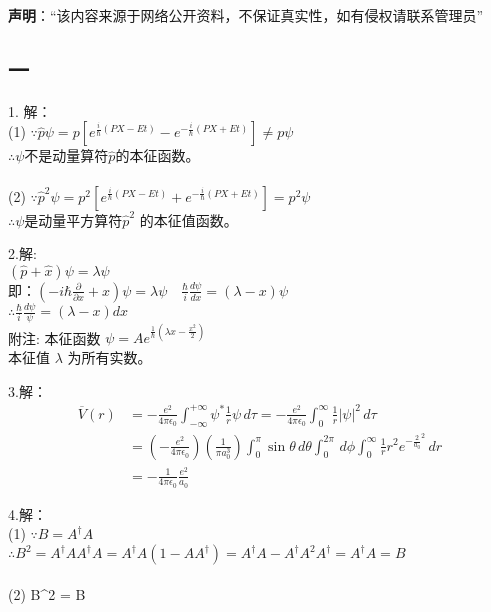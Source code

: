 
\textbf{声明}：“该内容来源于网络公开资料，不保证真实性，如有侵权请联系管理员”


\subsection{一}
1. 解：\\
(1) $\because \hat{p} \psi = p\left[e^{\frac{i}{\hbar}(PX - Et)} - e^{-\frac{i}{\hbar}(PX + Et)}\right] \neq p\psi$\\
 $\therefore \psi$不是动量算符$\hat{p}$的本征函数。\\\\
(2) $\because \hat{p}^2 \psi = p^2\left[e^{\frac{i}{\hbar}(PX - Et)} + e^{-\frac{i}{\hbar}(PX + Et)}\right] = p^2\psi$ \\
$\therefore \psi$是动量平方算符$\hat{p}^2$ 的本征值函数。 

2.解:\\
$(\hat{p} + \hat{x})\psi = \lambda \psi$\\
即：$(-i\hbar\frac{\partial}{\partial x} + x)\psi = \lambda \psi \quad \frac{\hbar}{i} \frac{d\psi}{dx} = (\lambda - x)\psi$ \\
$\therefore \frac{\hbar}{i} \frac{d\psi}{\psi} = (\lambda - x)dx$\\
附注: 本征函数 $\psi = Ae^{\frac{1}{\hbar}(\lambda x - \frac{x^2}{2})}$ \\
      本征值 $\lambda$ 为所有实数。

3.解：
\begin{align}
\overline{V}(r) &= -\frac{e^2}{4 \pi \epsilon_0} \int_{-\infty}^{+\infty} \psi^* \frac{1}{r} \psi \, d\tau 
= -\frac{e^2}{4 \pi \epsilon_0} \int_0^\infty \frac{1}{r} |\psi|^2 \, d\tau\\
&= \left( -\frac{e^2}{4 \pi \epsilon_0} \right) \left( \frac{1}{\pi a_0^3} \right) \int_0^\pi \sin \theta \, d\theta \int_0^{2\pi} \, d\phi \int_0^\infty \frac{1}{r} r^2 e^{-\frac{2}{a_0}^2} \, dr\\
&= -\frac{1}{4 \pi \epsilon_0} \frac{e^2}{a_0}~
\end{align}

4.解：\\
(1) $\because B = A^\dagger A$\\
$\therefore B^2 = A^\dagger A A^\dagger A = A^\dagger A \left(1 - AA^\dagger \right) = A^\dagger A - A^\dagger A^2 A^\dagger=A^\dagger A=B$\\\\
(2) 
\quad B^2 = B

